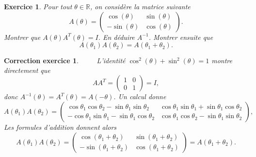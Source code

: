 \documentclass[12pt]{article}
\newtheorem{exercice}{\bf Exercice}
\newtheorem{correction}{\bf Correction exercice}
\newenvironment{exo}{
\begin{exercice}\smallskip\normalfont}{\end{exercice}
}
\newenvironment{cor}{
\begin{correction}\smallskip\normalfont}{\end{correction}
}
\newif\ifcorrige\corrigetrue
\begin{document}
\begin{exo} Pour tout $\theta \in \mathbb{R}$, on consid\`ere la matrice suivante
$$A(\theta)=\left ( \begin{array}{cc} \cos(\theta)&\sin(\theta)\\-\sin(\theta)&\cos(\theta)  \end{array}     \right).$$
Montrer que $A(\theta)A^T(\theta)=I$. En d\'eduire $A^{-1}$. Montrer ensuite que 
$$A(\theta_1)A(\theta_2)=A(\theta_1+\theta_2).$$
\end{exo}
\ifcorrige
\color{magenta}
\begin{cor}   $\qquad$   
L'identit\'e $\cos^2(\theta)+\sin^2(\theta)=1$ montre directement que
$$A A^T= \left ( \begin{array}{cc} 1&0\\0&1   \end{array}     \right)=I,$$
donc $A^{-1}(\theta)=A^T(\theta)=A(-\theta)$. Un calcul donne
$$A(\theta_1)A(\theta_2)= \left ( \begin{array}{cc} \cos\theta_1\cos\theta_2-\sin\theta_1\sin\theta_2&\cos\theta_1 \sin\theta_1+\sin\theta_1 \cos\theta_2\\ -\cos\theta_1 \sin\theta_1-\sin\theta_1 \cos\theta_2&  \cos\theta_1\cos\theta_2-\sin\theta_1\sin\theta_2  \end{array}     \right),$$
Les formules d'addition donnent alors 
$$ A(\theta_1)A(\theta_2)=\left ( \begin{array}{cc} \cos(\theta_1+\theta_2)&\sin(\theta_1+\theta_2)\\ -\sin(\theta_1+\theta_2)&\cos(\theta_1+\theta_2)  \end{array}     \right)=A(\theta_1+\theta_2).$$
    \end{cor}
\color{black}
\fi
\end{document}
